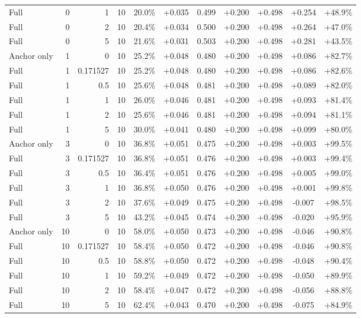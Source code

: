 \begin{table}[htbp]
\begin{tabular}{lrrrccccccc}
Full & 0 & 1 & 10 & 20.0\% & +0.035 & 0.499 & +0.200 & +0.498 & +0.254 & +48.9\% \\
Full & 0 & 2 & 10 & 20.4\% & +0.034 & 0.500 & +0.200 & +0.498 & +0.264 & +47.0\% \\
Full & 0 & 5 & 10 & 21.6\% & +0.031 & 0.503 & +0.200 & +0.498 & +0.281 & +43.5\% \\
Anchor only & 1 & 0 & 10 & 25.2\% & +0.048 & 0.480 & +0.200 & +0.498 & +0.086 & +82.7\% \\
Full & 1 & 0.171527 & 10 & 25.2\% & +0.048 & 0.480 & +0.200 & +0.498 & +0.086 & +82.6\% \\
Full & 1 & 0.5 & 10 & 25.6\% & +0.048 & 0.481 & +0.200 & +0.498 & +0.089 & +82.0\% \\
Full & 1 & 1 & 10 & 26.0\% & +0.046 & 0.481 & +0.200 & +0.498 & +0.093 & +81.4\% \\
Full & 1 & 2 & 10 & 25.6\% & +0.046 & 0.481 & +0.200 & +0.498 & +0.094 & +81.1\% \\
Full & 1 & 5 & 10 & 30.0\% & +0.041 & 0.480 & +0.200 & +0.498 & +0.099 & +80.0\% \\
Anchor only & 3 & 0 & 10 & 36.8\% & +0.051 & 0.475 & +0.200 & +0.498 & +0.003 & +99.5\% \\
Full & 3 & 0.171527 & 10 & 36.8\% & +0.051 & 0.476 & +0.200 & +0.498 & +0.003 & +99.4\% \\
Full & 3 & 0.5 & 10 & 36.4\% & +0.051 & 0.476 & +0.200 & +0.498 & +0.005 & +99.0\% \\
Full & 3 & 1 & 10 & 36.8\% & +0.050 & 0.476 & +0.200 & +0.498 & +0.001 & +99.8\% \\
Full & 3 & 2 & 10 & 37.6\% & +0.049 & 0.475 & +0.200 & +0.498 & -0.007 & +98.5\% \\
Full & 3 & 5 & 10 & 43.2\% & +0.045 & 0.474 & +0.200 & +0.498 & -0.020 & +95.9\% \\
Anchor only & 10 & 0 & 10 & 58.0\% & +0.050 & 0.473 & +0.200 & +0.498 & -0.046 & +90.8\% \\
Full & 10 & 0.171527 & 10 & 58.4\% & +0.050 & 0.472 & +0.200 & +0.498 & -0.046 & +90.8\% \\
Full & 10 & 0.5 & 10 & 58.8\% & +0.050 & 0.472 & +0.200 & +0.498 & -0.048 & +90.4\% \\
Full & 10 & 1 & 10 & 59.2\% & +0.049 & 0.472 & +0.200 & +0.498 & -0.050 & +89.9\% \\
Full & 10 & 2 & 10 & 58.4\% & +0.047 & 0.472 & +0.200 & +0.498 & -0.056 & +88.8\% \\
Full & 10 & 5 & 10 & 62.4\% & +0.043 & 0.470 & +0.200 & +0.498 & -0.075 & +84.9\% \\

\end{tabular}
\end{table}
